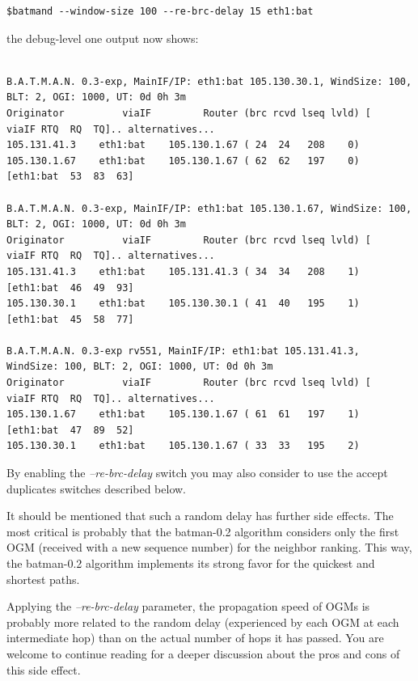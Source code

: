 \documentclass[11pt]{article}
\begin{document}
\begin{small}
\begin{verbatim}
$batmand --window-size 100 --re-brc-delay 15 eth1:bat
\end{verbatim}
\end{small}
%
the debug-level one output now shows:
%
\begin{small}
\begin{verbatim}

B.A.T.M.A.N. 0.3-exp, MainIF/IP: eth1:bat 105.130.30.1, WindSize: 100, BLT: 2, OGI: 1000, UT: 0d 0h 3m
Originator          viaIF         Router (brc rcvd lseq lvld) [   viaIF RTQ  RQ  TQ].. alternatives...
105.131.41.3    eth1:bat    105.130.1.67 ( 24  24   208    0)
105.130.1.67    eth1:bat    105.130.1.67 ( 62  62   197    0) [eth1:bat  53  83  63]

B.A.T.M.A.N. 0.3-exp, MainIF/IP: eth1:bat 105.130.1.67, WindSize: 100, BLT: 2, OGI: 1000, UT: 0d 0h 3m
Originator          viaIF         Router (brc rcvd lseq lvld) [   viaIF RTQ  RQ  TQ].. alternatives...
105.131.41.3    eth1:bat    105.131.41.3 ( 34  34   208    1) [eth1:bat  46  49  93]
105.130.30.1    eth1:bat    105.130.30.1 ( 41  40   195    1) [eth1:bat  45  58  77]

B.A.T.M.A.N. 0.3-exp rv551, MainIF/IP: eth1:bat 105.131.41.3, WindSize: 100, BLT: 2, OGI: 1000, UT: 0d 0h 3m
Originator          viaIF         Router (brc rcvd lseq lvld) [   viaIF RTQ  RQ  TQ].. alternatives...
105.130.1.67    eth1:bat    105.130.1.67 ( 61  61   197    1) [eth1:bat  47  89  52]
105.130.30.1    eth1:bat    105.130.1.67 ( 33  33   195    2)

\end{verbatim}
\end{small}

By enabling the \emph{--re-brc-delay} switch you may also consider to use the accept duplicates switches described below.

It should be mentioned that such a random delay has further side effects.
The most critical is probably that the batman-0.2 algorithm considers only the first OGM (received with a new sequence number) for the neighbor ranking. This way, the batman-0.2 algorithm implements its strong favor for the 
quickest and shortest paths. 

Applying the \emph{--re-brc-delay} parameter, the propagation speed of OGMs is probably more related to the random delay (experienced by each OGM at each intermediate hop) than on the actual number of hops it has passed. You are welcome to continue reading for a deeper discussion about the pros and cons of this side effect.
\end{document}
